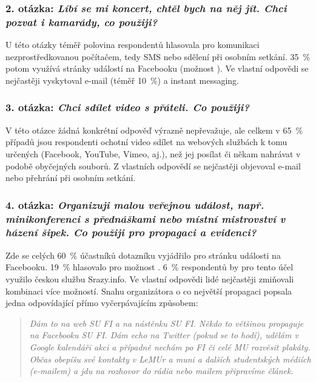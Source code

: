 \documentclass[12pt,oneside,final]{fithesis2}
\begin{document}
\subsubsection*{\textbf{2. otázka:} \emph{Líbí se mi koncert, chtěl bych na něj jít. Chci pozvat i kamarády, co použiji?}}
U této otázky téměř polovina respondentů hlasovala pro komunikaci nezprostředkovanou počítačem, tedy SMS nebo sdělení při osobním setkání. 35~\% potom využívá stránky událostí na Facebooku (možnost ). Ve vlastní odpovědi se nejčastěji vyskytoval e-mail (téměř 10~\%) a instant messaging.

\subsubsection*{\textbf{3. otázka:} \emph{Chci sdílet video s přáteli. Co použiji?}}
V této otázce žádná konkrétní odpověď výrazně nepřevažuje, ale celkem v 65~\% případů jsou respondenti ochotní video sdílet na webových službách k tomu určených (Facebook, YouTube, Vimeo, aj.), než jej posílat či někam nahrávat v podobě obyčejných souborů. Z vlastních odpovědí se nejčastěji objevoval e-mail nebo přehrání při osobním setkání.

\subsubsection*{\textbf{4. otázka:} \emph{Organizuji malou veřejnou událost, např. minikonferenci s přednáškami nebo místní mistrovství v házení šipek. Co použiji pro propagaci a evidenci?}}\label{propagationOfEventQuote}
Zde se celých 60~\% účastníků dotazníku vyjádřilo pro stránku události na Facebooku. 19~\% hlasovalo pro možnost . 6~\% respondentů by pro tento účel využilo českou službu Srazy.info. Ve vlastní odpovědi lidé nejčastěji zmiňovali kombinaci více možností. Snahu organizátora o co největší propagaci popsala jedna odpovídající přímo vyčerpávajícím způsobem:

\begin{quotation}
    \emph{Dám to na web SU FI a na nástěnku SU FI. Někdo to většinou propaguje na Facebooku SU FI. Dám echo na Twitter (pokud se to hodí), udělám v Google kalendáři akci a případně nechám po FI či celé MU rozvěsit plakáty. Občas obepíšu své kontakty v LeMUr a muni a dalších studentských médiích (e-mailem) a jdu na rozhovor do rádia nebo mailem připravíme článek.}
\end{quotation}
\end{document}
